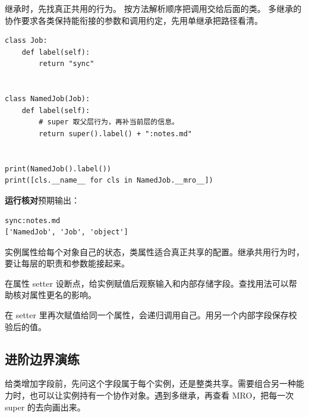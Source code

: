 继承时，先找真正共用的行为。 按方法解析顺序把调用交给后面的类。
多继承的协作要求各类保持能衔接的参数和调用约定，先用单继承把路径看清。


\begin{lstlisting}[title={\code{inherit_name.py}}]
class Job:
    def label(self):
        return "sync"


class NamedJob(Job):
    def label(self):
        # super 取父层行为，再补当前层的信息。
        return super().label() + ":notes.md"


print(NamedJob().label())
print([cls.__name__ for cls in NamedJob.__mro__])
\end{lstlisting}


\textbf{运行核对}\enspace 预期输出：
\begin{lstlisting}[language={},numbers=none]
sync:notes.md
['NamedJob', 'Job', 'object']
\end{lstlisting}

\par

\begin{myunderstanding}
实例属性给每个对象自己的状态，类属性适合真正共享的配置。继承共用行为时，要让每层的职责和参数能接起来。
\end{myunderstanding}

\begin{pycharmpractice}
在属性 setter 设断点，给实例赋值后观察输入和内部存储字段。查找用法可以帮助核对属性更名的影响。
\end{pycharmpractice}

\begin{pitfall}
在 setter 里再次赋值给同一个属性，会递归调用自己。用另一个内部字段保存校验后的值。
\end{pitfall}

\subsection*{进阶边界演练}
给类增加字段前，先问这个字段属于每个实例，还是整类共享。需要组合另一种能力时，也可以让实例持有一个协作对象。遇到多继承，再查看 MRO，把每一次 super 的去向画出来。
